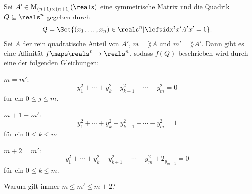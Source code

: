 \begin{satz}\label{affine_hauptachsentranformation_reelle_quadriken}
  Sei \( A'\in \Mat_{(n+1)\times(n+1)}(\reals) \) eine symmetrische Matrix und die Quadrik \( Q\subseteq \reals^n \) gegeben durch
  \begin{equation*}
    Q=\Set{(x_1,\dotsc,x_n)\in \reals^n|\transpose{x'}A'x'=0}.
  \end{equation*}
  Sei \( A \) der rein quadratische Anteil von \( A' \), \( m=\rang A \) und \( m'=\rang A' \). Dann gibt es eine Affinität \( f\maps \reals^n\to \reals^n \), sodass \( f(Q) \) beschrieben wird durch eine der folgenden Gleichungen:
  \begin{eigenschaftenenumerate}
    \item \( m=m' \):
    \begin{equation*}
      y_1^2+\dotsb+y_k^2-y_{k+1}^2-\dotsb-y_m^2=0
    \end{equation*}
    für ein \( 0\leq j \leq m \).
    \item \( m+1=m' \):
    \begin{equation*}
      y_1^2+\dotsb+y_k^2-y_{k+1}^2-\dotsb-y_m^2=1
    \end{equation*}
    für ein \( 0\leq k \leq m \).
    \item \( m+2=m' \):
    \begin{equation*}
      y_1^2+\dotsb+y_k^2-y_{k+1}^2-\dotsb-y_m^2+2_{y_{m+1}}=0
    \end{equation*}
    für ein \( 0\leq k\leq m \).
  \end{eigenschaftenenumerate} 
\end{satz}
\begin{frageuebung}
  Warum gilt immer \( m\leq m'\leq m+2 \)?
\end{frageuebung}
